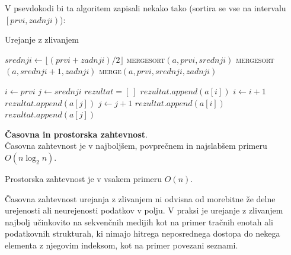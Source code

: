 \documentclass[a4paper,oneside]{article}
\begin{document}
V psevdokodi bi ta algoritem zapisali nekako tako (sortira se vse na intervalu
$\left[prvi, zadnji\right)$):

\begin{algorithm}
  \caption{Urejanje z zlivanjem}\label{algo:mergesort}
  \begin{algorithmic}[1]
         \Return \EndIf
        \State $srednji \gets \lfloor(prvi + zadnji) / 2\rfloor$
        \State \textsc{mergesort}$(a, prvi, srednji)$
        \State \textsc{mergesort}$(a, srednji + 1, zadnji)$
        \State \textsc{merge}$(a, prvi, srednji, zadnji)$
    \EndFunction
  \end{algorithmic}
\end{algorithm}
\begin{algorithm}
  \begin{algorithmic}[1]
        \State $i \gets prvi$
        \State $j \gets srednji$
        \State $rezultat = [\ ]$ 
                \State $rezultat.append(a[i])$ 
                \State $i \gets i + 1$
            \Else
                \State $rezultat.append(a[j])$ 
                \State $j \gets j + 1$
            \EndIf
        \EndWhile
            \State $rezultat.append(a[i])$ 
        \EndWhile
            \State $rezultat.append(a[j])$ 
        \EndWhile
    \EndFunction
  \end{algorithmic}
\end{algorithm}

\textbf{Časovna in prostorska zahtevnost}. \\
Časovna zahtevnost je v najboljšem, povprečnem in najslabšem primeru $O(n\log_2 n)$.

Prostorska zahtevnost je v vsakem primeru $O(n)$. %

Časovna zahtevnost urejanja z zlivanjem ni odvisna od morebitne že delne urejenosti ali
neurejenosti podatkov v polju. V praksi je urejanje z zlivanjem najbolj učinkovito na
sekvenčnih medijih kot na primer tračnih enotah ali podatkovnih strukturah, ki nimajo hitrega
neposrednega dostopa do nekega elementa z njegovim indeksom, kot na primer povezani seznami.
\end{document}
